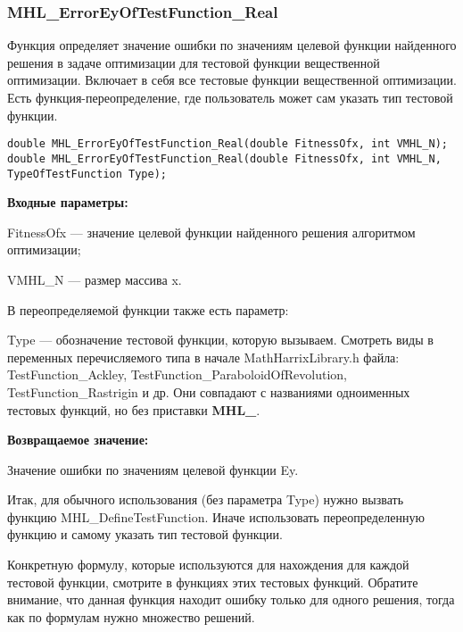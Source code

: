 \documentclass[a4paper,12pt]{article}
\begin{document}
\subsubsection{MHL\_ErrorEyOfTestFunction\_Real}\label{MHL_ErrorEyOfTestFunction_Real}

Функция определяет значение ошибки по значениям целевой функции найденного решения в задаче оптимизации для тестовой функции вещественной оптимизации. Включает в себя все тестовые функции вещественной оптимизации. Есть функция-переопределение, где пользователь может сам указать тип тестовой функции.


\begin{lstlisting}[label=code_syntax_MHL_ErrorEyOfTestFunction_Real,caption=Синтаксис]
double MHL_ErrorEyOfTestFunction_Real(double FitnessOfx, int VMHL_N);
double MHL_ErrorEyOfTestFunction_Real(double FitnessOfx, int VMHL_N, TypeOfTestFunction Type);
\end{lstlisting}

\textbf{Входные параметры:}

FitnessOfx --- значение целевой функции найденного решения алгоритмом оптимизации;

VMHL\_N --- размер массива x.

В переопределяемой функции также есть параметр:
  
Type --- обозначение тестовой функции, которую вызываем.
Смотреть виды в переменных перечисляемого типа в начале MathHarrixLibrary.h файла: TestFunction\_Ackley, TestFunction\_ParaboloidOfRevolution, TestFunction\_Rastrigin и др. Они совпадают с названиями одноименных тестовых функций, но без приставки \textbf{MHL\_}.

\textbf{Возвращаемое значение:}
 
Значение ошибки по значениям целевой функции Ey.

Итак, для обычного использования (без параметра Type) нужно вызвать функцию MHL\_DefineTestFunction. Иначе использовать переопределенную функцию и самому указать тип тестовой функции.

Конкретную формулу, которые используются для нахождения для каждой тестовой функции, смотрите в функциях этих тестовых функций. Обратите внимание, что данная функция находит ошибку только для одного решения, тогда как по формулам нужно множество решений.
\end{document}
